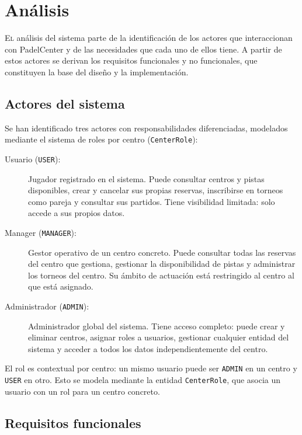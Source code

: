 \chapter{Análisis}
\label{chap:analisis}

\lettrine{E}{l} análisis del sistema parte de la identificación de los actores
que interaccionan con PadelCenter y de las necesidades que cada uno de ellos
tiene. A partir de estos actores se derivan los requisitos funcionales y no
funcionales, que constituyen la base del diseño y la implementación.

\section{Actores del sistema}
\label{sec:actores}

Se han identificado tres actores con responsabilidades diferenciadas, modelados
mediante el sistema de roles por centro (\texttt{CenterRole}):

\begin{description}
  \item[Usuario (\texttt{USER}):] Jugador registrado en el sistema. Puede
    consultar centros y pistas disponibles, crear y cancelar sus propias reservas,
    inscribirse en torneos como pareja y consultar sus partidos. Tiene visibilidad
    limitada: solo accede a sus propios datos.

  \item[Manager (\texttt{MANAGER}):] Gestor operativo de un centro concreto.
    Puede consultar todas las reservas del centro que gestiona, gestionar la
    disponibilidad de pistas y administrar los torneos del centro. Su ámbito de
    actuación está restringido al centro al que está asignado.

  \item[Administrador (\texttt{ADMIN}):] Administrador global del sistema.
    Tiene acceso completo: puede crear y eliminar centros, asignar roles a
    usuarios, gestionar cualquier entidad del sistema y acceder a todos los datos
    independientemente del centro.
\end{description}

El rol es contextual por centro: un mismo usuario puede ser \texttt{ADMIN} en
un centro y \texttt{USER} en otro. Esto se modela mediante la entidad
\texttt{CenterRole}, que asocia un usuario con un rol para un centro concreto.

\section{Requisitos funcionales}
\label{sec:requisitos_funcionales}

